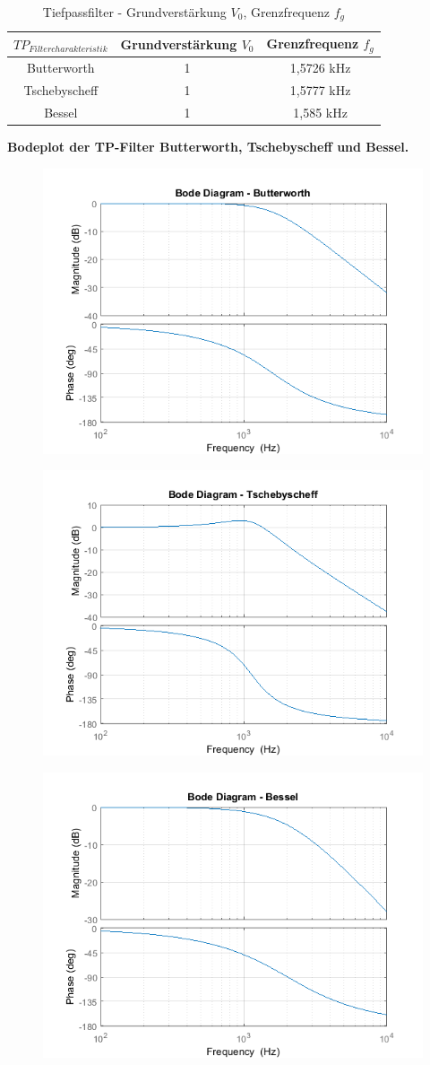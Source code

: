 \begin{table}[h]
	\centering
	\begin{tabular}{c|c|c}
		$TP_{Filtercharakteristik}$ & Grundverstärkung $V_{0}$	& Grenzfrequenz $f_{g}$	\\
		\hline
		\hline
		Butterworth	& 1	& 1,5726 kHz	\\
		Tschebyscheff	& 1	& 1,5777 kHz	\\
		Bessel	& 1	& 1,585 kHz 	\\
	\end{tabular}
	\caption{Tiefpassfilter - Grundverstärkung $V_{0}$, Grenzfrequenz $f_{g}$ }
	\label{tab:Tiefpaesse_Grundverstaerkung}
\end{table}

\newpage

\textbf{Bodeplot der TP-Filter Butterworth, Tschebyscheff und Bessel.}

\begin{figure}[h]
\centering
\includegraphics[width=0.3\linewidth]{Bilder/TP_Butterworth}
\caption{}
\label{fig:TP_Butterworth}
\end{figure}

\begin{figure}[h]
\centering
\includegraphics[width=0.3\linewidth]{Bilder/TP_Tschebyscheff}
\caption{}
\label{fig:TP_Tschebyscheff}
\end{figure}

\begin{figure}[h]
\centering
\includegraphics[width=0.3\linewidth]{Bilder/TP_Bessel}
\caption{}
\label{fig:TP_Bessel}
\end{figure}

